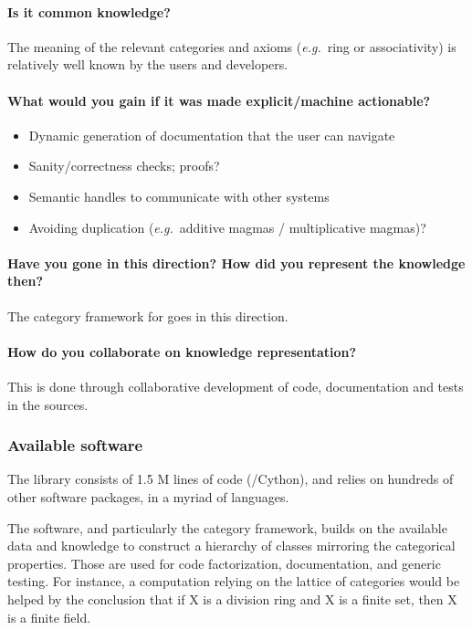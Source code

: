 \paragraph{Is it common knowledge?}

The meaning of the relevant categories and axioms (\emph{e.g.}~ring or associativity) is relatively well known by the users and developers.


\paragraph{What would you gain if it was made explicit/machine actionable?}
\begin{itemize}
\item Dynamic generation of documentation that the user can navigate
\item Sanity/correctness checks; proofs?
\item Semantic handles to communicate with other systems
\item Avoiding duplication (\emph{e.g.}~additive magmas / multiplicative magmas)?
\end{itemize}

\paragraph{Have you gone in this direction? How did you represent the knowledge then?}
The \textsf{category} framework for \SageMath goes in this direction.

\paragraph{How do you collaborate on knowledge representation?}
This is done through collaborative development of code, documentation and tests in the \SageMath sources.

\subsubsection{Available software}
The \SageMath library consists of 1.5 M lines of code (\python/Cython), and relies on hundreds of other software packages, in a myriad of languages.

The software, and particularly the \textsf{category} framework, builds on the available data and knowledge to construct a hierarchy of classes mirroring the categorical properties.  Those are used for code factorization, documentation, and generic testing. For instance, a computation relying on the lattice of categories would be helped by the conclusion that if X is a division ring and X is a finite set, then X is a finite field.


